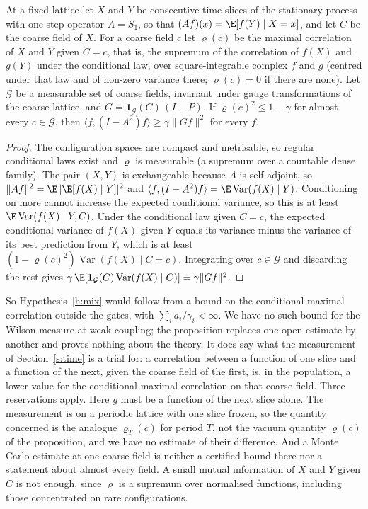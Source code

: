 \begin{proposition}\label{p:pred}
At a fixed lattice let $X$ and $Y$ be consecutive time slices of the stationary process with one-step operator
$A=S_1$, so that $(Af)(x)=\E[f(Y)\mid X=x]$, and let $C$ be the coarse field of $X$. For a coarse field $c$ let
$\varrho(c)$ be the maximal correlation of $X$ and $Y$ given $C=c$, that is, the supremum of the correlation
of $f(X)$ and $g(Y)$ under the conditional law, over square-integrable complex $f$ and $g$ (centred under
that law and of non-zero variance there; $\varrho(c)=0$ if there are none). Let $\mathcal G$ be a
measurable set of coarse fields, invariant under gauge transformations of the coarse lattice, and $G=\mathbf 1_{\mathcal G}(C)\,(I-P)$. If $\varrho(c)^2\le1-\gamma$ for
almost every $c\in\mathcal G$, then $\langle f,(I-A^2)f\rangle\ge\gamma\|Gf\|^2$ for every $f$.
\end{proposition}
\begin{proof}
The configuration spaces are compact and metrisable, so regular conditional laws exist and $\varrho$ is
measurable (a supremum over a countable dense family). The pair $(X,Y)$ is exchangeable because $A$ is self-adjoint, so $\|Af\|^2=\E\,|\E[f(X)\mid Y]|^2$ and
$\langle f,(I-A^2)f\rangle=\E\operatorname{Var}(f(X)\mid Y)$. Conditioning on more cannot increase the expected
conditional variance, so this is at least $\E\operatorname{Var}(f(X)\mid Y,C)$. Under the conditional law given
$C=c$, the expected conditional variance of $f(X)$ given $Y$ equals its variance minus the variance of its
best prediction from $Y$, which is at least $(1-\varrho(c)^2)\operatorname{Var}(f(X)\mid C=c)$. Integrating
over $c\in\mathcal G$ and discarding the rest gives
$\gamma\,\E[\mathbf 1_{\mathcal G}(C)\operatorname{Var}(f(X)\mid C)]=\gamma\|Gf\|^2$.
\end{proof}

So Hypothesis~\ref{h:mix} would follow from a bound on the conditional maximal correlation outside the gates,
with $\sum_ia_i/\gamma_i<\infty$. We have no such bound for the Wilson measure at weak coupling; the
proposition replaces one open estimate by another and proves nothing about the theory. It does say what the
measurement of Section~\ref{s:time} is a trial for: a correlation between a function of one slice and a
function of the next, given the coarse field of the first, is, in the population, a lower value for the conditional maximal
correlation on that coarse field. Three reservations apply. Here $g$ must be a function of the next slice
alone. The measurement is on a periodic lattice with one slice frozen, so the quantity concerned is the
analogue $\varrho_T(c)$ for period $T$, not the vacuum quantity $\varrho(c)$ of the proposition, and we have
no estimate of their difference. And a Monte Carlo estimate at one coarse field is neither a certified bound
there nor a statement about almost every field. A small mutual information of $X$ and $Y$ given $C$ is not enough, since $\varrho$ is a supremum over
normalised functions, including those concentrated on rare configurations.

